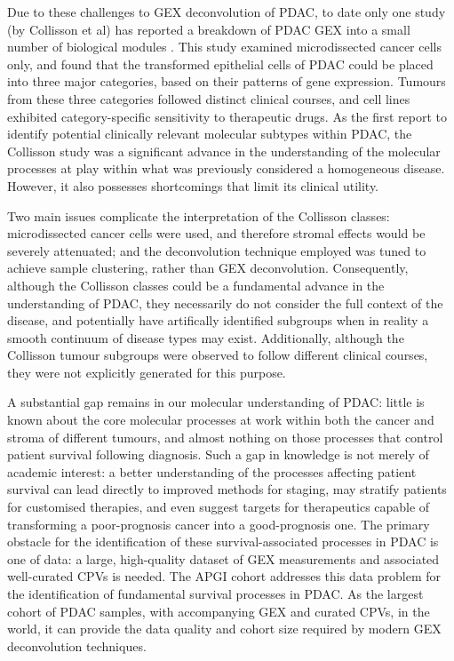 \documentclass[dissertation.tex]{subfiles}
\begin{document}
Due to these challenges to \gls{GEX} deconvolution of \gls{PDAC}, to date only one study (by Collisson et al) has reported a breakdown of \gls{PDAC} \gls{GEX} into a small number of biological modules \cite{Collisson2011}.  This study examined microdissected cancer cells only, and found that the transformed epithelial cells of \gls{PDAC} could be placed into three major categories, based on their patterns of gene expression.  Tumours from these three categories followed distinct clinical courses, and cell lines exhibited category-specific sensitivity to therapeutic drugs.  As the first report to identify potential clinically relevant molecular subtypes within \gls{PDAC}, the Collisson study was a significant advance in the understanding of the molecular processes at play within what was previously considered a homogeneous disease.  However, it also possesses shortcomings that limit its clinical utility.

Two main issues complicate the interpretation of the Collisson classes: microdissected cancer cells were used, and therefore stromal effects would be severely attenuated; and the deconvolution technique employed was tuned to achieve sample clustering, rather than \gls{GEX} deconvolution.  Consequently, although the Collisson classes could be a fundamental advance in the understanding of \gls{PDAC}, they necessarily do not consider the full context of the disease, and potentially have artifically identified subgroups when in reality a smooth continuum of disease types may exist.  Additionally, although the Collisson tumour subgroups were observed to follow different clinical courses, they were not explicitly generated for this purpose. 

A substantial gap remains in our molecular understanding of \gls{PDAC}: little is known about the core molecular processes at work within both the cancer and stroma of different tumours, and almost nothing on those processes that control patient survival following diagnosis.  Such a gap in knowledge is not merely of academic interest: a better understanding of the processes affecting patient survival can lead directly to improved methods for staging, may stratify patients for customised therapies, and even suggest targets for therapeutics capable of transforming a poor-prognosis cancer into a good-prognosis one.  The primary obstacle for the identification of these survival-associated processes in \gls{PDAC} is one of data: a large, high-quality dataset of \gls{GEX} measurements and associated well-curated \glspl{CPV} is needed.  The \gls{APGI} cohort addresses this data problem for the identification of fundamental survival processes in \gls{PDAC}.  As the largest cohort of \gls{PDAC} samples, with accompanying \gls{GEX} and curated \glspl{CPV}, in the world, it can provide the data quality and cohort size required by modern \gls{GEX} deconvolution techniques.
\end{document}
